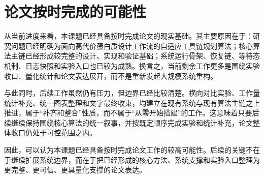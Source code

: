\section{论文按时完成的可能性}

从当前进度来看，本课题已经具备按时完成论文的现实基础。其主要原因在于：研究问题已经明确为面向高代价蛋白质设计工作流的自适应工具链规划算法；核心算法主链已经形成较完整的设计、实现和验证基础；系统运行骨架、恢复链、等待态机制、日志快照和实验入口也已较为成熟。换言之，当前剩余工作更多是围绕实验收口、量化统计和论文表达展开，而不是重新发起大规模系统重构。

与此同时，后续工作虽然仍有压力，但边界已经比较清楚。横向对比实验、工作量统计补充、统一图表整理和文字最终收束，均建立在现有系统与现有算法主链之上推进，属于“补齐和整合”性质，而不属于“从零开始搭建”的工作。这意味着只要后续继续保持围绕核心算法的统一叙事，并按既定顺序完成实验和统计补充，论文整体收口仍处于可控范围之内。

因此，可以认为本课题已经具备按时完成论文工作的较高可能性。后续的关键不在于继续扩展系统边界，而在于把已经形成的核心方法、系统支撑和实验入口整理为更完整、更可信、更具量化支撑的论文表达。
